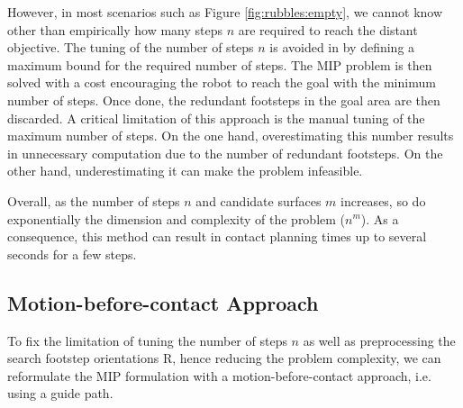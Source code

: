 However, in most scenarios such as Figure \ref{fig:rubbles:empty}, we cannot know other than empirically how many steps $n$ are required to reach the distant objective.
The tuning of the number of steps $n$ is avoided in \cite{deits2014FootPlanMI} by defining a maximum bound for the required number of steps. The MIP problem is then solved with a cost encouraging the robot to reach the goal with the minimum number of steps. 
Once done, the redundant footsteps in the goal area are then discarded.
A critical limitation of this approach is the manual tuning of the maximum number of steps. 
On the one hand, overestimating this number results in unnecessary computation due to the number of redundant footsteps.
On the other hand, underestimating it can make the problem infeasible.

Overall, as the number of steps $n$ and candidate surfaces $m$ increases, so do exponentially the dimension and complexity of the problem ($n^m$). As a consequence, this method can result in contact planning times up to several seconds for a few steps.


\subsection{Motion-before-contact Approach}
To fix the limitation of tuning the number of steps $n$ as well as preprocessing the search footstep orientations R, hence reducing the problem complexity, we can reformulate the MIP formulation with a motion-before-contact approach, i.e. using a guide path.

